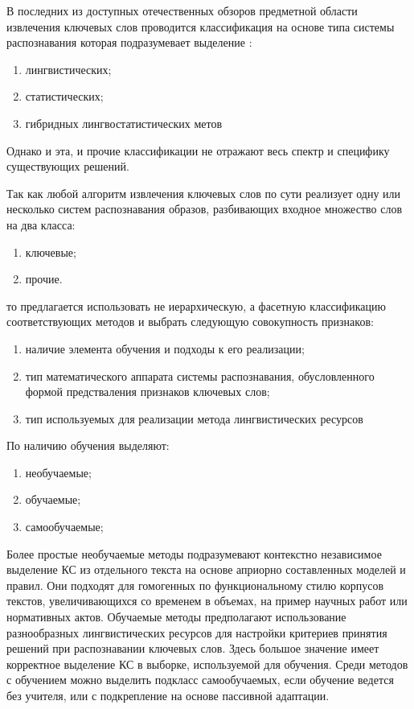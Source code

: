 В последних из доступных отечественных обзоров предметной области извлечения ключевых слов проводится классификация на основе типа системы распознавания которая подразумевает выделение \cite{7}:
\begin{enumerate}
	\item лингвистических;
	\item статистических;
	\item гибридных лингвостатистических метов
\end{enumerate}

Однако и эта, и прочие классификации не отражают весь спектр и специфику существующих решений.

Так как любой алгоритм извлечения ключевых слов по сути реализует одну или несколько систем распознавания образов, разбивающих входное множество слов на два класса:
\begin{enumerate}
	\item ключевые;
	\item прочие.
\end{enumerate}

то предлагается использовать не иерархическую, а фасетную классификацию соответствующих методов и выбрать следующую совокупность признаков:
\begin{enumerate}
	\item наличие элемента обучения и подходы к его реализации;
	\item тип математического аппарата системы распознавания, обусловленного формой предстваления признаков ключевых слов;
	\item тип используемых для реализации метода лингвистических ресурсов
\end{enumerate}

По наличию обучения выделяют:
\begin{enumerate}
	\item необучаемые;
	\item обучаемые;
	\item самообучаемые; 
\end{enumerate}
Более простые необучаемые методы подразумевают контекстно независимое выделение КС из отдельного текста на основе априорно составленных моделей и правил. Они подходят для гомогенных по функциональному стилю корпусов текстов, увеличивающихся со временем в объемах, на пример научных работ или нормативных актов.
Обучаемые методы предполагают использование разнообразных лингвистических ресурсов для настройки критериев принятия решений при распознавании ключевых слов.
Здесь большое значение имеет корректное выделение КС в выборке, используемой для обучения.
Среди методов с обучением можно выделить подкласс самообучаемых, если обучение ведется без учителя, или с подкрепление на основе пассивной адаптации.\cite{20}

